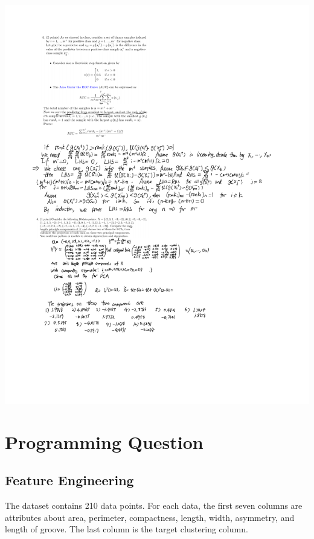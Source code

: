 \documentclass{article}[12]
\begin{document}
\includegraphics[scale=0.5]{2.png}
\newpage

\section{Programming Question}

\subsection{Feature Engineering}


The dataset contains 210 data points. For
each data, the first seven columns are attributes about area, perimeter, compactness, length, width, asymmetry, and length of groove. The last column is the target clustering column. 
\end{document}

